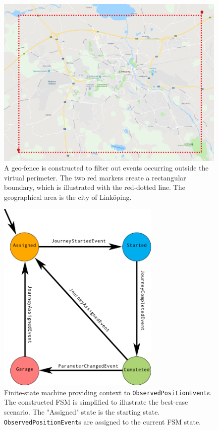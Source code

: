 \begin{figure}[t]
    \centering
    \includegraphics[width=\textwidth]{figures/geofencing_linkoping}
    \caption[A geo-fence is constructed to filter out events occurring outside the virtual perimeter]
    {\small A geo-fence is constructed to filter out events occurring outside the virtual perimeter.
    The two red markers create a rectangular boundary, which is illustrated with the red-dotted line.
    The geographical area is the city of Linköping.}
    \label{fig:geo-fence}
\end{figure}

\begin{figure}[t]
    \centering
    \includegraphics[width=0.7\textwidth]{figures/context-state-machine}
    \caption[Finite-state machine providing context to \texttt{ObservedPositionEvent}s]
    {\small Finite-state machine providing context to \texttt{ObservedPositionEvent}s. 
    The constructed FSM is simplified to illustrate the best-case scenario.
    The "Assigned" state is the starting state.
    \texttt{ObservedPositionEvent}s are assigned to the current FSM state.
    }
    \label{fig:context-state-machine}
\end{figure}


